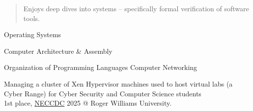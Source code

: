  \begin{quote}
    Enjoys deep dives into systems -- specifically formal verification of software tools.
  \end{quote}


  \smallskip{}

  \smallskip{}
  
  Operating Systems \par
  Computer Architecture \& Assembly \par
  Organization of Programming Languages
  Computer Networking
  

  Managing a cluster of Xen Hypervisor machines used to host virtual labs (a Cyber Range) for Cyber Security and Computer Science students
  \\
  1st place, \href{neccdl.org}{NECCDC} 2025 @ Roger Williams University.

